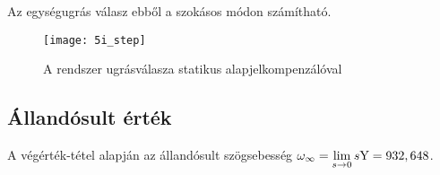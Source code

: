 Az egységugrás válasz ebből a szokásos módon számítható.
\begin{figure}[H]
	\centering
	\texttt{[image: 5i\_step]}
	\caption{A rendszer ugrásválasza statikus alapjelkompenzálóval}
	\label{fig:5i_step}
\end{figure}


\subsection{Állandósult érték}

A végérték-tétel alapján az állandósult szögsebesség $\omega_\infty = \lim\limits_{s\rightarrow 0}s\mathrm{Y} = 932,648$.

